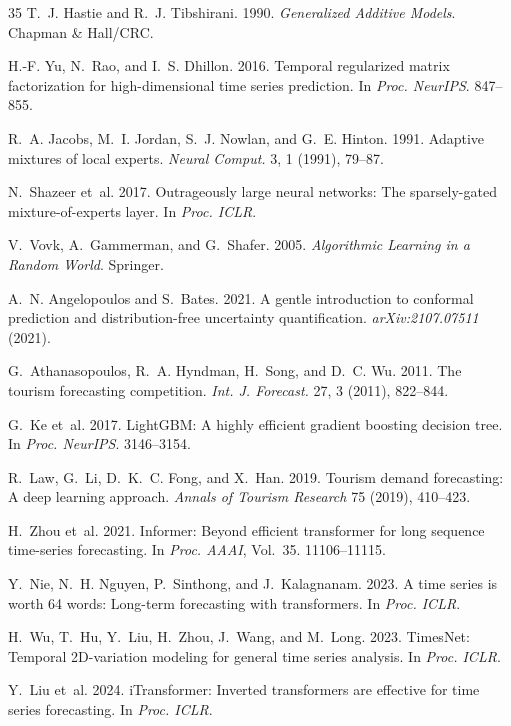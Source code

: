 \documentclass[sigconf]{acmart}
\begin{document}
\begin{thebibliography}{35}
T.~J. Hastie and R.~J. Tibshirani. 1990. \emph{Generalized Additive Models}. Chapman \& Hall/CRC.

H.-F. Yu, N.~Rao, and I.~S. Dhillon. 2016. Temporal regularized matrix factorization for high-dimensional time series prediction. In \emph{Proc. NeurIPS}. 847--855.

R.~A. Jacobs, M.~I. Jordan, S.~J. Nowlan, and G.~E. Hinton. 1991. Adaptive mixtures of local experts. \emph{Neural Comput.} 3, 1 (1991), 79--87.

N.~Shazeer et~al. 2017. Outrageously large neural networks: The sparsely-gated mixture-of-experts layer. In \emph{Proc. ICLR}.

V.~Vovk, A.~Gammerman, and G.~Shafer. 2005. \emph{Algorithmic Learning in a Random World}. Springer.

A.~N. Angelopoulos and S.~Bates. 2021. A gentle introduction to conformal prediction and distribution-free uncertainty quantification. \emph{arXiv:2107.07511} (2021).

G.~Athanasopoulos, R.~A. Hyndman, H.~Song, and D.~C. Wu. 2011. The tourism forecasting competition. \emph{Int. J. Forecast.} 27, 3 (2011), 822--844.

G.~Ke et~al. 2017. LightGBM: A highly efficient gradient boosting decision tree. In \emph{Proc. NeurIPS}. 3146--3154.

R.~Law, G.~Li, D.~K.~C. Fong, and X.~Han. 2019. Tourism demand forecasting: A deep learning approach. \emph{Annals of Tourism Research} 75 (2019), 410--423.

H.~Zhou et~al. 2021. Informer: Beyond efficient transformer for long sequence time-series forecasting. In \emph{Proc. AAAI}, Vol.~35. 11106--11115.

Y.~Nie, N.~H. Nguyen, P.~Sinthong, and J.~Kalagnanam. 2023. A time series is worth 64 words: Long-term forecasting with transformers. In \emph{Proc. ICLR}.

H.~Wu, T.~Hu, Y.~Liu, H.~Zhou, J.~Wang, and M.~Long. 2023. TimesNet: Temporal 2D-variation modeling for general time series analysis. In \emph{Proc. ICLR}.

Y.~Liu et~al. 2024. iTransformer: Inverted transformers are effective for time series forecasting. In \emph{Proc. ICLR}.


\end{thebibliography}
\end{document}
